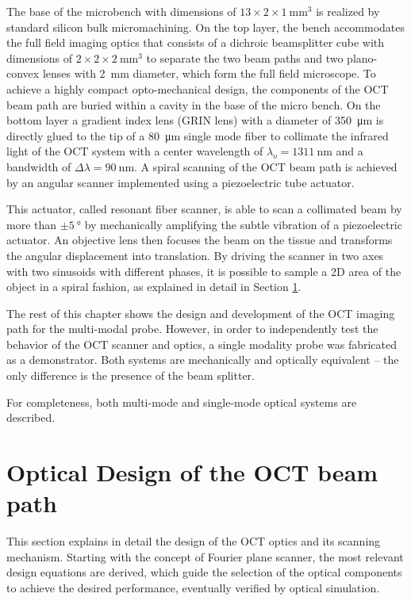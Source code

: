 The base of the microbench with dimensions of $13 \times 2 \times \SI{1}{\milli\meter^3} $ is realized by standard silicon bulk micromachining. On the top layer, the bench accommodates the full field imaging optics that consists of a dichroic beamsplitter cube with dimensions of $2\times 2 \times  \SI{2}{\milli\meter^3}$ to separate the two beam paths and two plano-convex lenses with \SI{2}{\milli\meter} diameter, which form the full field microscope. To achieve a highly compact opto-mechanical design, the components of the OCT beam path are buried within a cavity in the base of the micro bench. On the bottom layer a gradient index lens (GRIN lens) with a diameter of \SI{350}{\micro\meter} is directly glued to the tip of a \SI{80}{\micro\meter} single mode fiber to collimate the infrared light of the OCT system with a center wavelength of $\lambda_o = \SI{1311}{\nano\meter}$ and a bandwidth of $\Delta \lambda = \SI{90}{\nano\meter} $. A spiral scanning of the OCT beam path is achieved by an angular scanner implemented using a piezoelectric tube actuator.

This actuator, called resonant fiber scanner, is able to scan a collimated beam by more than $\pm \SI{5}{\degree}$ by mechanically amplifying the subtle vibration of a piezoelectric actuator.  An objective lens then focuses the beam on the tissue and transforms the angular displacement into translation. By driving the scanner in two axes with two sinusoids with different phases, it is possible to sample a 2D area of the object in a spiral fashion, as explained in detail in Section \ref{sec:Optical}.

The rest of this chapter shows the design and development of the OCT imaging path for the multi-modal probe. However, in order to independently test the behavior of the OCT scanner and optics, a single modality probe was fabricated as a demonstrator. Both systems are mechanically and optically equivalent -- the only difference is the presence of the beam splitter. 

For completeness, both multi-mode and single-mode optical systems are described.


\section{Optical Design of the OCT beam path}
\label{sec:Optical}
This section explains in detail the design of the OCT optics and its scanning mechanism. Starting with the concept of Fourier plane scanner, the most relevant design equations are derived, which guide the selection of the optical components to achieve the desired performance, eventually verified by optical simulation. 

